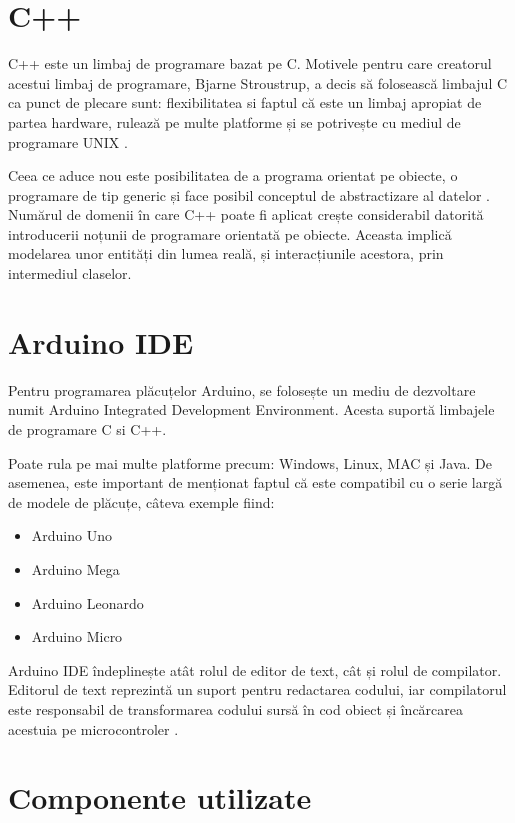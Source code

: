 \section{C++}

	C++ este un limbaj de programare bazat pe C. Motivele pentru care creatorul acestui limbaj de programare, Bjarne Stroustrup, a decis să folosească limbajul C ca punct de plecare sunt: flexibilitatea si faptul că este un limbaj apropiat de partea hardware, rulează pe multe platforme și se potrivește cu mediul de programare UNIX \cite{c++}.

	Ceea ce aduce nou este posibilitatea de a programa orientat pe obiecte, o programare de tip generic și face posibil conceptul de abstractizare al datelor \cite{c++}. Numărul de domenii în care C++ poate fi aplicat crește considerabil datorită introducerii noțunii de programare orientată pe obiecte. Aceasta implică modelarea unor entități din lumea reală, și interacțiunile acestora, prin intermediul claselor. 

\section{Arduino IDE}

	

	Pentru programarea plăcuțelor Arduino, se folosește un mediu de dezvoltare numit Arduino Integrated Development Environment. Acesta suportă limbajele de programare C si C++. 

	Poate rula pe mai multe platforme precum: Windows, Linux, MAC și Java. De asemenea, este important de menționat faptul că este compatibil cu o serie largă de modele de plăcuțe, câteva exemple fiind:
		\begin{itemize}
			\setlength{\itemindent}{2em}
			\itemsep0em
			\item Arduino Uno
			\item Arduino Mega
			\item Arduino Leonardo
			\item Arduino Micro \cite{arduinoIDE}
		\end{itemize} 

	Arduino IDE îndeplinește atât rolul de editor de text, cât și rolul de compilator. Editorul de text reprezintă un suport pentru redactarea codului, iar compilatorul este responsabil de transformarea codului sursă în cod obiect și încărcarea acestuia pe microcontroler \cite{arduinoIDE}.

\section{Componente utilizate}

